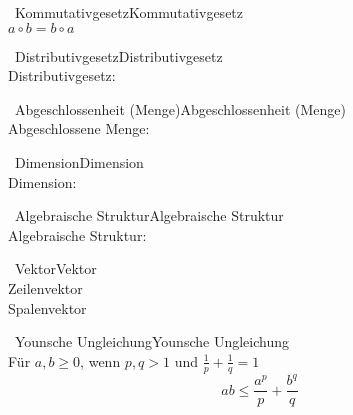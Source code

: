 		\begin{proposition}{\currentboxsection \ Kommutativgesetz}{Kommutativgesetz} \label{kommutativ}  \\
			$a \circ b = b \circ a$
		\end{proposition}
		
		\begin{proposition}{\currentboxsection \ Distributivgesetz}{Distributivgesetz} \label{distributiv}  \\
			Distributivgesetz:
		\end{proposition}
		
		\begin{proposition}{\currentboxsection \ Abgeschlossenheit (Menge)}{Abgeschlossenheit (Menge)} \label{abgeschlossenheit_menge}  \\
			Abgeschlossene Menge:
		\end{proposition}
		
		\begin{proposition}{\currentboxsection \ Dimension}{Dimension} \label{dimension}  \\
			Dimension:
		\end{proposition}
		
		\begin{proposition}{\currentboxsection \ Algebraische Struktur}{Algebraische Struktur} \label{algebraische_struktur}  \\
			Algebraische Struktur:
		\end{proposition}
		
		\begin{proposition}{\currentboxsection \ Vektor}{Vektor} \label{vektor}  \\
			Zeilenvektor  \\
			Spalenvektor 
		\end{proposition}
		
		\begin{proposition}{\currentboxsection \ Younsche Ungleichung}{Younsche Ungleichung} \label{younsche_ungleichung}  \\
			Für $a,b \geq 0$, wenn $p,q > 1$ und $\frac{1}{p} + \frac{1}{q} = 1$
			\begin{equation}
			ab \leq \frac{a^p}{p} + \frac{b^q}{q}
			\end{equation}
		\end{proposition}
		
